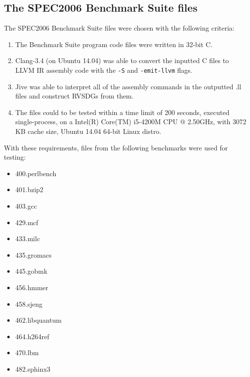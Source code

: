 \subsection{The SPEC2006 Benchmark Suite files}
\label{sub:meth:SPEC2006_files}

The SPEC2006 Benchmark Suite files were chosen with the following criteria:

\begin{enumerate}
	\item The Benchmark Suite program code files were written in 32-bit C.

	\item Clang-3.4 (on Ubuntu 14.04) was able to convert the inputted C files
to LLVM IR assembly code with the \lstinline!-S! and \lstinline!-emit-llvm!
flags.

	\item Jive was able to interpret all of the assembly commands in the
outputted .ll files and construct RVSDGs from them.

	\item The files could to be tested within a time limit of 200 seconds,
executed single-process, on a Intel(R) Core(TM) i5-4200M CPU @ 2.50GHz, with
3072 KB cache size, Ubuntu 14.04 64-bit Linux distro.
\end{enumerate}


With these requirements, files from the following benchmarks were used for
testing:

\begin{multicols}{4}
	\begin{itemize}
		\item 400.perlbench
		\item 401.bzip2
		\item 403.gcc
		\item 429.mcf
		\item 433.milc
		\item 435.gromacs
		\item 445.gobmk
		\item 456.hmmer
		\item 458.sjeng
		\item 462.libquantum
		\item 464.h264ref
		\item 470.lbm
		\item 482.sphinx3
	\end{itemize}
\end{multicols}

